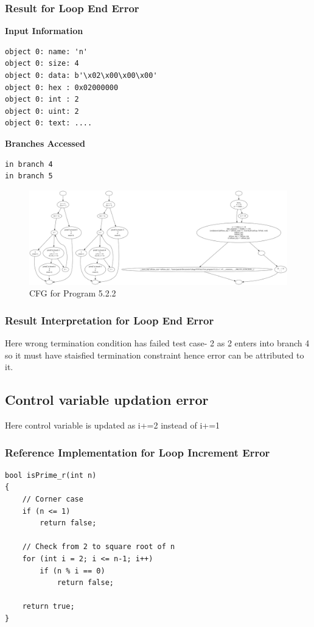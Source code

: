 \subsubsection{Result for Loop End Error}
\textbf{Input Information}
\begin{verbatim}
object 0: name: 'n'
object 0: size: 4
object 0: data: b'\x02\x00\x00\x00'
object 0: hex : 0x02000000
object 0: int : 2
object 0: uint: 2
object 0: text: ....
\end{verbatim}
\textbf{Branches Accessed}
\begin{verbatim}
in branch 4
in branch 5
\end{verbatim}
\begin{figure}[h]
\centering
\includegraphics[width=1\textwidth]{5/5.2.2.c.png}
\caption{CFG for Program 5.2.2}
\label{fig:cfg5.2.2}
\end{figure}
\subsubsection{Result Interpretation for Loop End Error}
Here wrong termination condition has failed test case- 2 as 2 enters into branch 4 so it must have staisfied termination constraint hence error can be attributed to it.



\subsection{Control variable updation error}
Here control variable is updated as i+=2 instead of i+=1
\subsubsection{Reference Implementation for Loop Increment Error}
\begin{verbatim}
bool isPrime_r(int n)
{
    // Corner case
    if (n <= 1)
        return false;
 
    // Check from 2 to square root of n
    for (int i = 2; i <= n-1; i++)
        if (n % i == 0)
            return false;
 
    return true;
}
\end{verbatim}
